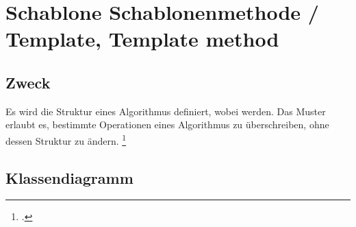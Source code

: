 \documentclass{lehramt-informatik}
\begin{document}

\chapter{Schablone Schablonenmethode / Template, Template method}

\begin{quellen}
\item \cite{wiki:schablone}
\item \cite[Seite 274-278]{gof}
\item \cite[Seite 68 - 70]{eilebrecht}
\end{quellen}

%

\section{Zweck}

Es wird die Struktur eines Algorithmus definiert, wobei  werden. Das Muster erlaubt
es, bestimmte Operationen eines Algorithmus zu überschreiben, ohne
dessen Struktur zu ändern.
\footcite[Seite 68]{eilebrecht}

%

\section{Klassendiagramm}

\end{document}
